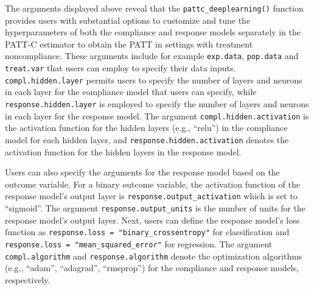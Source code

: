 The arguments displayed above reveal that the \texttt{pattc\_deeplearning()}
function provides users with substantial options to customize and tune
the hyperparameters of both the compliance and response models
separately in the PATT-C estimator to obtain the PATT in settings with
treatment noncompliance. These arguments include for example \texttt{exp.data},
\texttt{pop.data} and \texttt{treat.var} that users can employ to specify their data
inputs. \texttt{compl.hidden.layer} permits users to specify the number of
layers and neurons in each layer for the compliance model that users can
specify, while \texttt{response.hidden.layer} is employed to specify the number
of layers and neurons in each layer for the response model. The argument
\texttt{compl.hidden.activation} is the activation function for the hidden
layers (e.g., ``relu'') in the compliance model for each hidden layer, and
\texttt{response.hidden.activation} denotes the activation function for the
hidden layers in the response model.

Users can also specify the arguments for the response model based on the
outcome variable. For a binary outcome variable, the activation function
of the response model's output layer is \texttt{response.output\_activation}
which is set to ``sigmoid''. The argument \texttt{response.output\_units} is the
number of units for the response model's output layer. Next, users can
define the response model's loss function as
\texttt{response.loss\ =\ "binary\_crossentropy"} for classification and
\texttt{response.loss\ =\ "mean\_squared\_error"} for regression. The argument
\texttt{compl.algorithm} and \texttt{response.algorithm} denote the optimization
algorithms (e.g., ``adam'', ``adagrad'', ``rmsprop'') for the compliance and
response models, respectively.

